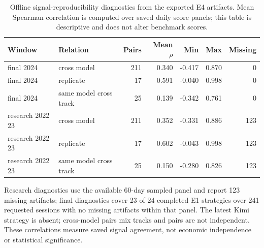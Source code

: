 \begin{table}[htbp]
\centering
\footnotesize
\caption{Offline signal-reproducibility diagnostics from the exported E4 artifacts. Mean Spearman correlation is computed over saved daily score panels; this table is descriptive and does not alter benchmark scores.}
\label{tab:signal_diagnostics}
\setlength{\tabcolsep}{3pt}
\begin{tabular}{@{}llrrrrr@{}}
\toprule
Window & Relation & Pairs & Mean $\rho$ & Min & Max & Missing \\
\midrule
final 2024 & cross model & 211 & 0.340 & -0.417 & 0.870 & 0 \\
final 2024 & replicate & 17 & 0.591 & -0.040 & 0.998 & 0 \\
final 2024 & same model cross track & 25 & 0.139 & -0.342 & 0.761 & 0 \\
research 2022 23 & cross model & 211 & 0.352 & -0.331 & 0.886 & 123 \\
research 2022 23 & replicate & 17 & 0.602 & -0.043 & 0.998 & 123 \\
research 2022 23 & same model cross track & 25 & 0.150 & -0.280 & 0.826 & 123 \\
\bottomrule
\end{tabular}
\par\smallskip
\begin{minipage}{\linewidth}\footnotesize Research diagnostics use the available 60-day sampled panel and report 123 missing artifacts; final diagnostics cover 23 of 24 completed E1 strategies over 241 requested sessions with no missing artifacts within that panel. The latest Kimi strategy is absent; cross-model pairs mix tracks and pairs are not independent. These correlations measure saved signal agreement, not economic independence or statistical significance.\end{minipage}
\end{table}
